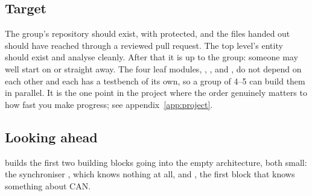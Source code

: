 \subsection*{Target}
The group's repository should exist, with  protected, and the files handed out should
have reached  through a reviewed pull request. The top level's entity should exist and analyse
cleanly. After that it is up to the group: someone may well start on  or
 straight away. The four leaf modules, , ,
 and , do not depend on each other and each has a testbench of
its own, so a group of 4--5 can build them in parallel. It is the one point in the project where the
order genuinely matters to how fast you make progress; see appendix~\ref{app:project}.

\subsection*{Looking ahead}
 builds the first two building blocks going into the empty architecture, both small:
the synchroniser , which knows nothing at all, and , the first block
that knows something about CAN.
